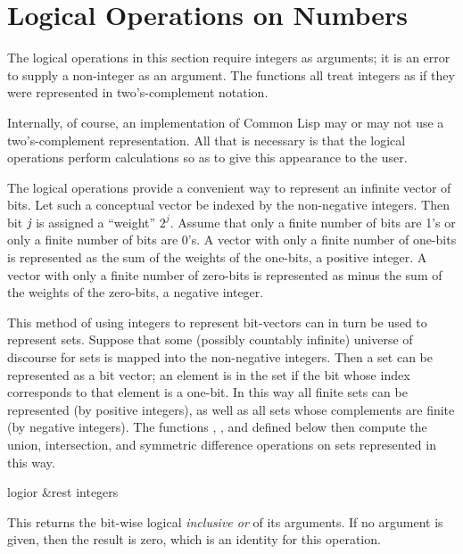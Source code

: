 \section{Logical Operations on Numbers}

The logical operations in this section require integers
as arguments; it is an error to supply a non-integer as an argument.
The functions all treat integers as if
they were represented in two's-complement notation.

\beforenoterule
\begin{implementation}
Internally, of course, an implementation of
Common Lisp may or may not use a two's-complement representation.
All that is necessary is that the logical operations
perform calculations so as to give this appearance to the user.
\end{implementation}
\afternoterule

The logical operations provide a convenient way to represent
an infinite vector of bits.  Let such a conceptual vector be
indexed by the non-negative integers.  Then bit $\emph{j}$ is assigned
a ``weight'' $2^{j}$.
Assume that only a finite number of bits are 1's
or only a finite number of bits are 0's.
A vector with only a finite number of one-bits is represented
as the sum of the weights of the one-bits, a positive integer.
A vector with only a finite number of zero-bits is represented
as  minus the sum of the weights of the zero-bits, a negative integer.

This method of using integers to represent bit-vectors can in turn
be used to represent sets.  Suppose that some (possibly countably
infinite) universe of discourse
for sets is mapped into the non-negative integers.
Then a set can be represented as a bit vector; an element is in the
set if the bit whose index corresponds to that element is a one-bit.
In this way all finite sets can be represented (by positive
integers), as well as all sets whose complements are finite
(by negative integers).  The functions , ,
and  defined below then compute the union,
intersection, and symmetric difference operations on sets
represented in this way.

\begin{defun}[Function]
logior &rest integers

This returns the bit-wise logical \emph{inclusive or} of its arguments.
If no argument is given, then the result is zero,
which is an identity for this operation.
\end{defun}

